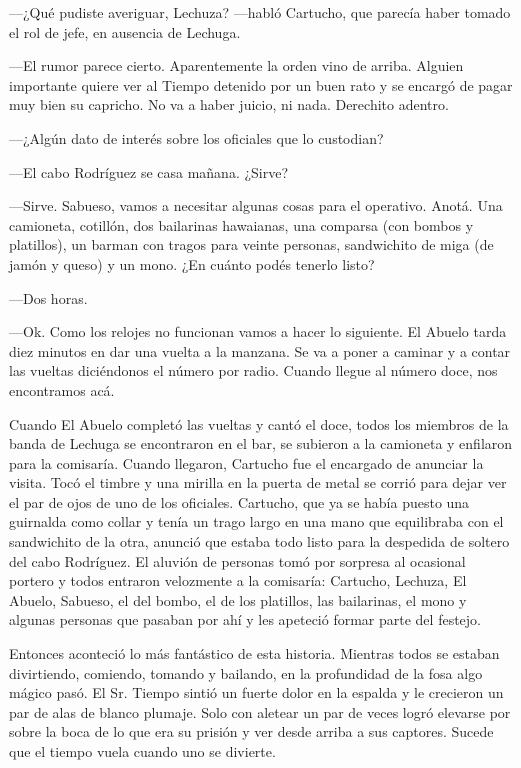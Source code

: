 \documentclass[11pt,twoside,openright,a5paper]{book}
\begin{document}
---¿Qué pudiste averiguar, Lechuza? ---habló Cartucho, que parecía haber tomado el rol de jefe, en ausencia de Lechuga.

---El rumor parece cierto. Aparentemente la orden vino de arriba. Alguien importante quiere ver al Tiempo detenido por un buen rato y se encargó de pagar muy bien su capricho. No va a haber juicio, ni nada. Derechito adentro.

---¿Algún dato de interés sobre los oficiales que lo custodian?

---El cabo Rodríguez se casa mañana. ¿Sirve?

---Sirve. Sabueso, vamos a necesitar algunas cosas para el operativo. Anotá. Una camioneta, cotillón, dos bailarinas hawaianas, una comparsa (con bombos y platillos), un barman con tragos para veinte personas,  sandwichito de miga (de jamón y queso) y un mono. ¿En cuánto podés tenerlo listo?

---Dos horas.

---Ok. Como los relojes no funcionan vamos a hacer lo siguiente. El Abuelo tarda diez  minutos en dar una vuelta a la manzana. Se va a poner a caminar y a contar las vueltas diciéndonos el número por radio. Cuando llegue al número doce, nos encontramos acá.

Cuando El Abuelo completó las vueltas y cantó el doce, todos los miembros de la banda de Lechuga se encontraron en el bar, se subieron a la camioneta y enfilaron para la comisaría.
Cuando llegaron, Cartucho fue el encargado de anunciar la visita. Tocó el timbre y una mirilla en la puerta de metal se corrió para dejar ver el par de ojos de uno de los oficiales. Cartucho, que ya se había puesto una guirnalda como collar y tenía un trago largo en una mano que equilibraba con el sandwichito de la otra, anunció que estaba todo listo para la despedida de soltero del cabo Rodríguez. El aluvión de personas tomó por sorpresa al ocasional portero y todos entraron velozmente a la comisaría: Cartucho, Lechuza, El Abuelo, Sabueso, el del bombo, el de los platillos, las bailarinas, el mono y algunas personas que pasaban por ahí y les apeteció formar parte del festejo.

Entonces aconteció lo más fantástico de esta historia. Mientras todos se estaban divirtiendo, comiendo, tomando y bailando, en la profundidad de la fosa algo mágico pasó. El Sr. Tiempo sintió un fuerte dolor en la espalda y le crecieron un par de alas de blanco plumaje. Solo con aletear un par de veces logró elevarse por sobre la boca de lo que era su prisión y ver desde arriba a sus captores. Sucede que el tiempo vuela cuando uno se divierte.
\end{document}
